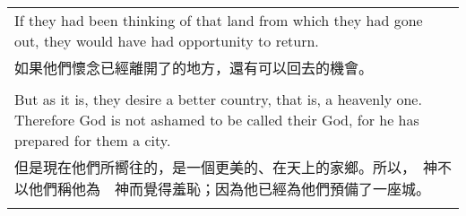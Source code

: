 \documentclass{book}
\begin{document}
\begin{tabularx}{\textwidth}{p{}}
If they had been thinking of that land from which they had gone out, they would have had opportunity to return. \\
如果他們懷念已經離開了的地方，還有可以回去的機會。 \\ \\
But as it is, they desire a better country, that is, a heavenly one. Therefore God is not ashamed to be called their God, for he has prepared for them a city. \\
但是現在他們所嚮往的，是一個更美的、在天上的家鄉。所以，　神不以他們稱他為　神而覺得羞恥；因為他已經為他們預備了一座城。 \\ \\

\hline
\end{tabularx}

\newpage
\end{document}

